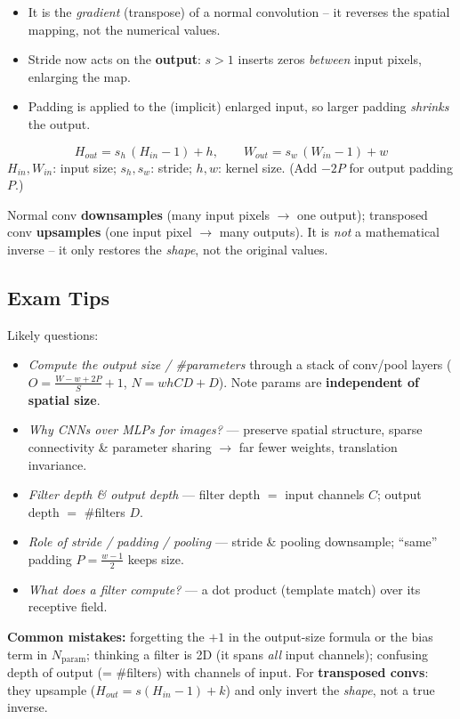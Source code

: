 \documentclass[10pt,a4paper]{article}
\begin{document}
	\begin{itemize}[leftmargin=*]
		\item It is the \emph{gradient} (transpose) of a normal convolution -- it reverses the spatial mapping, not the numerical values.
		\item Stride now acts on the \textbf{output}: $s>1$ inserts zeros \emph{between} input pixels, enlarging the map.
		\item Padding is applied to the (implicit) enlarged input, so larger padding \emph{shrinks} the output.
	\end{itemize}

	\begin{formulabox}
		\[
		H_{out} = s_h\,(H_{in}-1) + h, \qquad
		W_{out} = s_w\,(W_{in}-1) + w
		\]
		\small $H_{in},W_{in}$: input size; $s_h,s_w$: stride; $h,w$: kernel size.
		(Add $-2P$ for output padding $P$.)
	\end{formulabox}

	\begin{importantbox}
		Normal conv \textbf{downsamples} (many input pixels $\rightarrow$ one output); transposed conv \textbf{upsamples} (one input pixel $\rightarrow$ many outputs). It is \emph{not} a mathematical inverse -- it only restores the \emph{shape}, not the original values.
	\end{importantbox}

	\subsection{Exam Tips}

	\begin{examtipbox}
		Likely questions:
		\begin{itemize}[leftmargin=*]
			\item \emph{Compute the output size / \#parameters} through a stack of conv/pool layers ($O=\frac{W-w+2P}{S}+1$, $N=whCD+D$). Note params are \textbf{independent of spatial size}.
			\item \emph{Why CNNs over MLPs for images?} --- preserve spatial structure, sparse connectivity \& parameter sharing $\rightarrow$ far fewer weights, translation invariance.
			\item \emph{Filter depth \& output depth} --- filter depth $=$ input channels $C$; output depth $=$ \#filters $D$.
			\item \emph{Role of stride / padding / pooling} --- stride \& pooling downsample; ``same'' padding $P=\frac{w-1}{2}$ keeps size.
			\item \emph{What does a filter compute?} --- a dot product (template match) over its receptive field.
		\end{itemize}
		\textbf{Common mistakes:} forgetting the $+1$ in the output-size formula or the bias term in $N_{\text{param}}$; thinking a filter is 2D (it spans \emph{all} input channels); confusing depth of output (= \#filters) with channels of input. For \textbf{transposed convs}: they upsample ($H_{out}=s(H_{in}-1)+k$) and only invert the \emph{shape}, not a true inverse.
	\end{examtipbox}
	
\end{document}
